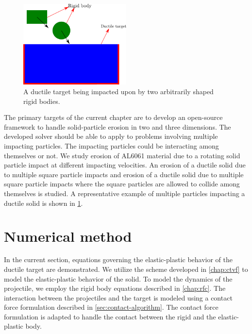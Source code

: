 \begin{figure}[!htpb]
  \centering
  \includegraphics[width=0.5\textwidth]{images/erosion/images/intro/intro_description}
  \caption{A ductile target being impacted upon by two arbitrarily shaped rigid bodies.}
\label{fig:spe-intro}
\end{figure}
The primary targets of the current chapter are to develop an open-source
framework to handle solid-particle erosion in two and three dimensions. The
developed solver should be able to apply to problems involving multiple
impacting particles. The impacting particles could be interacting among
themselves or not. We study erosion of AL6061 material due to a rotating solid
particle impact at different impacting velocities. An erosion of a ductile solid
due to multiple square particle impacts and erosion of a ductile solid due to
multiple square particle impacts where the square particles are allowed to
collide among themselves is studied. A representative example of multiple
particles impacting a ductile solid is shown in \cref{fig:spe-intro}.


\FloatBarrier%
\section{Numerical method}
\label{sec:erosion-numerical-method}
In the current section, equations governing the elastic-plastic behavior of the
ductile target are demonstrated. We utilize the scheme developed in
\cref{chap:ctvf} to model the elastic-plastic behavior of the solid. To model
the dynamics of the projectile, we employ the rigid body equations described in
\cref{chap:rfc}. The interaction between the projectiles and the target is
modeled using a contact force formulation described in
\cref{sec:contact-algorithm}. The contact force formulation is adapted to handle
the contact between the rigid and the elastic-plastic body.
